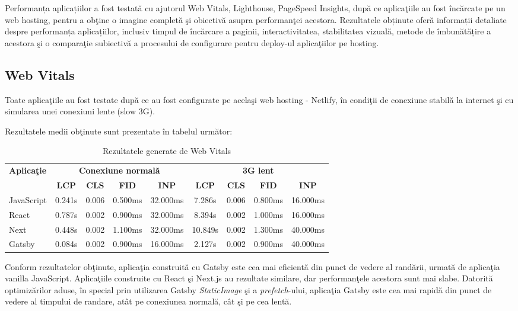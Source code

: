 \documentclass[12pt, a4paper]{report}
\begin{document}
Performanța aplicațiilor a fost testat\u a cu ajutorul Web Vitals, Lighthouse, PageSpeed Insights, dup\u a ce aplica\c tiile au fost \^inc\u arcate pe un web hosting, pentru a ob\c tine o imagine complet\u a \c si obiectiv\u a asupra performan\c tei acestora. 
Rezultatele obținute oferă informații detaliate despre performanța aplicațiilor, inclusiv timpul de încărcare a paginii, interactivitatea, stabilitatea vizuală, metode de îmbunătățire a acestora \c si o compara\c tie subiectiv\u a a procesului de configurare pentru deploy-ul aplica\c tiilor pe hosting. 

\subsection{Web Vitals}

Toate aplica\c tiile au fost testate dup\u a ce au fost configurate pe acela\c si web hosting - Netlify, \^in condi\c tii de conexiune stabil\u a la internet \c si cu simularea unei conexiuni lente (slow 3G). 

Rezultatele medii ob\c tinute sunt prezentate \^in tabelul urm\u ator:


\begin{table}[htbp]
	\centering
	\begin{tabular}{lcccccccc}
		\toprule
		\multirow{2}{*}{\textbf{Aplica\c tie}} & \multicolumn{4}{c}{\textbf{Conexiune normal\u a}} & \multicolumn{4}{c}{\textbf{3G lent}} \\
		\cmidrule(lr){2-5} \cmidrule(l){6-9}
		& \textbf{LCP} & \textbf{CLS} & \textbf{FID} & \textbf{INP} & \textbf{LCP} & \textbf{CLS} & \textbf{FID} & \textbf{INP} \\
		\midrule
		JavaScript & 0.241s & 0.006 & 0.500ms & 32.000ms & 7.286s & 0.006 & 0.800ms & 16.000ms \\
		React & 0.787s & 0.002 & 0.900ms & 32.000ms & 8.394s & 0.002 & 1.000ms & 16.000ms \\
		Next & 0.448s & 0.002 & 1.100ms & 32.000ms & 10.849s & 0.002 & 1.300ms & 40.000ms \\
		Gatsby & 0.084s & 0.002 & 0.900ms & 16.000ms & 2.127s & 0.002 & 0.900ms & 40.000ms \\
		\bottomrule
	\end{tabular}
	\caption{Rezultatele generate de Web Vitals}
	\label{tab:metrics-web-vitals}
\end{table}

Conform rezultatelor ob\c tinute, aplica\c tia construit\u a cu Gatsby este cea mai eficient\u a din punct de vedere al rand\u arii, urmat\u a de aplica\c tia vanilla JavaScript. Aplica\c tiile construite cu React \c si Next.js au rezultate similare, dar performan\c tele acestora sunt mai slabe. Datorit\u a optimiz\u arilor aduse, \^in special prin utilizarea Gatsby \textit{StaticImage} \c si a \textit{prefetch}-ului, aplica\c tia Gatsby este cea mai rapid\u a din punct de vedere al timpului de randare, at\^at pe conexiunea normal\u a, c\^at \c si pe cea lent\u a.
\end{document}

